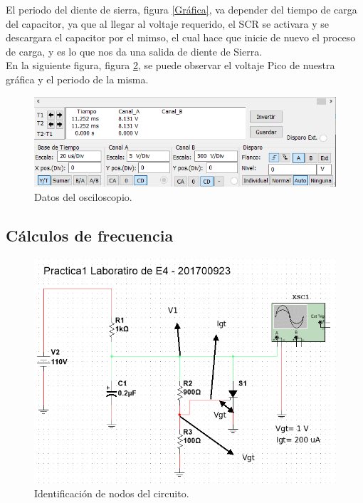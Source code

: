 \documentclass[osajnl,twocolumn,showpacs,superscriptaddress,10pt]{revtex4-1}
\begin{document}
El periodo del diente de sierra, figura \ref{Gráfica}, va depender del tiempo de carga del capacitor, ya que al llegar al voltaje requerido, el SCR se activara y se descargara el capacitor por el mimso, el cual hace que inicie de nuevo el proceso de carga, y es lo que nos da una salida de diente de Sierra.\\

En la siguiente figura, figura \ref{Datos}, se puede observar el voltaje Pico de nuestra gráfica y el periodo de la misma.\\

\begin{figure}[H]
\centering
\includegraphics[width = \columnwidth]{Datos.png}
\caption{Datos del osciloscopio.}
\label{Datos}
\end{figure}

\subsection{Cálculos de frecuencia}

\begin{figure}[H]
\centering
\includegraphics[width = \columnwidth]{Diagrama_calculado.png}
\caption{Identificación de nodos del circuito.}
\label{Datos}
\end{figure}
\end{document}
